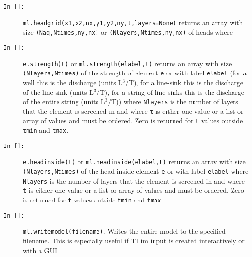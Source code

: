\documentclass [10pt,letterpaper] {article}
\begin{document}
\begin{description}
\item[{\tt In []:}] {\tt ml.headgrid(x1,x2,nx,y1,y2,ny,t,layers=None)} returns an array with size {\tt (Naq,Ntimes,ny,nx)} or {\tt (Nlayers,Ntimes,ny,nx)} of heads where
    
\item[{\tt In []:}] {\tt e.strength(t)} or {\tt ml.strength(elabel,t)} returns an array with size {\tt (Nlayers,Ntimes)} of the strength of element {\tt e} or with label {\tt elabel}  (for a well
this is the discharge (units L$^3$/T), for a line-sink this is the discharge of the line-sink (units L$^3$/T), for a string of line-sinks this is the discharge of the entire string (units L$^3$/T)) where {\tt Nlayers} is the number of layers that the element is screened in and where 
 {\tt t} is either one value or a list or array of values and must be ordered. Zero is returned for {\tt t} values outside {\tt tmin} and {\tt tmax}.
 
\item[{\tt In []:}] {\tt e.headinside(t)} or {\tt ml.headinside(elabel,t)} returns an array with size {\tt (Nlayers,Ntimes)} of the head inside element {\tt e} or with label {\tt elabel}  where {\tt Nlayers} is the number of layers that the element is screened in and where 
 {\tt t} is either one value or a list or array of values and must be ordered. Zero is returned for {\tt t} values outside {\tt tmin} and {\tt tmax}.
 
\item[{\tt In []:}] {\tt ml.writemodel(filename)}. Writes the entire model to the specified filename. This is especially useful if TTim input is created interactively or with a GUI.



\end{description}
\end{document}
